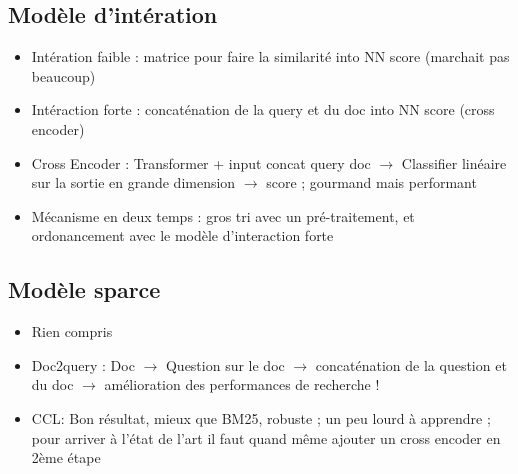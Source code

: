 \documentclass{article}
\begin{document}
\begin{multicols}{2}
\subsection{Modèle d'intération}
\begin{itemize}
    \item Intération faible : matrice pour faire la similarité into NN score (marchait pas beaucoup)
    \item Intéraction forte : concaténation de la query et du doc into NN score (cross encoder)
    \item Cross Encoder : Transformer + input concat query doc $\rightarrow$ Classifier linéaire sur la sortie en grande dimension $\rightarrow$ score ; gourmand mais performant 
    \item Mécanisme en deux temps : gros tri avec un pré-traitement, et ordonancement avec le modèle d'interaction forte
\end{itemize}
\subsection{Modèle sparce}
\begin{itemize}
    \item Rien compris
    \item Doc2query : Doc $\rightarrow$ Question sur le doc $\rightarrow$ concaténation de la question et du doc $\rightarrow$ amélioration des performances de recherche !
    \item CCL:  Bon résultat, mieux que BM25, robuste ; un peu lourd à apprendre ; pour arriver à l'état de l'art il faut quand même ajouter un cross encoder en 2ème étape
\end{itemize}


\end{multicols}
\end{document}
